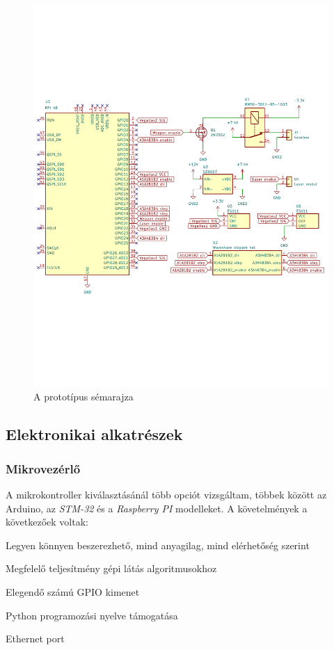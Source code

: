 \documentclass[12pt,a4paper]{article}
\begin{document}
\begin{figure}[h!]
	\centering
	\includegraphics[width=1\linewidth]{schematic}
	\caption{A prototípus sémarajza}
	\label{fig:schematic}
\end{figure}


\subsection{Elektronikai alkatrészek}
\subsubsection*{Mikrovezérlő}
A mikrokontroller kiválasztásánál több opciót vizsgáltam, többek között az {Arduino}, az \textsl{STM-32} és a \textsl{Raspberry PI} modelleket. A követelmények a következőek voltak:

\begin{list}{-}{}
	\item Legyen könnyen beszerezhető, mind anyagilag, mind elérhetőség szerint
	\item Megfelelő teljesítmény gépi látás algoritmusokhoz
	\item Elegendő számú GPIO kimenet
	\item Python programozási nyelve támogatása
	\item Ethernet port
\end{list}
\end{document}
